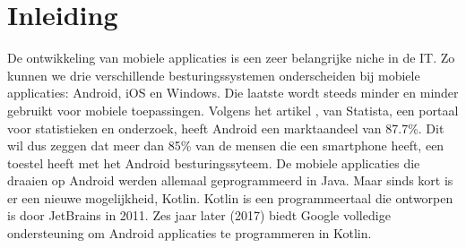 
\chapter*{Inleiding}
\label{ch:inleiding}




 De ontwikkeling van mobiele applicaties is een zeer belangrijke niche in de IT. Zo kunnen we drie verschillende besturingssystemen onderscheiden bij mobiele applicaties: Android, iOS en Windows. Die laatste wordt steeds minder en minder gebruikt voor mobiele toepassingen. Volgens het artikel \textcite{Statista2018}, van Statista, een portaal voor statistieken en onderzoek, heeft Android een marktaandeel van 87.7\%. Dit wil dus zeggen dat meer dan 85\% van de mensen die een smartphone heeft, een toestel heeft met het Android besturingssyteem. 
 \newline
 \newline
 De mobiele applicaties die draaien op Android werden allemaal geprogrammeerd in Java. Maar sinds kort is er een nieuwe mogelijkheid, Kotlin. Kotlin is een programmeertaal die ontworpen is door JetBrains in 2011. Zes jaar later (2017) biedt Google volledige ondersteuning om Android applicaties te programmeren in Kotlin. 

